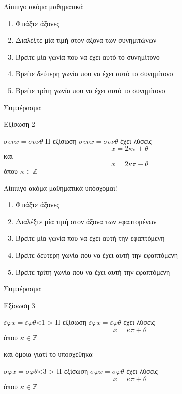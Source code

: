\documentclass[greek]{beamer}
\begin{document}
\begin{frame}{Λίιιιιιγο ακόμα μαθηματικά}
 \begin{enumerate}
  \item<1-> Φτιάξτε άξονες
  \item<2-> Διαλέξτε μία τιμή στον άξονα των συνημιτώνων
  \item<3-> Βρείτε μία γωνία που να έχει αυτό το συνημίτονο
  \item<4-> Βρείτε δεύτερη γωνία που να έχει αυτό το συνημίτονο
  \item<5-> Βρείτε τρίτη γωνία που να έχει αυτό το συνημίτονο
 \end{enumerate}
  Συμπέρασμα
\end{frame}

\begin{frame}{Εξίσωση 2}
 \begin{block}{$συνx=συνθ$}
  Η εξίσωση $συνx=συνθ$ έχει λύσεις
  $$x=2κπ+θ$$
  και
  $$x=2κπ-θ$$
  όπου $κ\in\mathbb{Z}$
 \end{block}
\end{frame}

\begin{frame}{Λίιιιιιγο ακόμα μαθηματικά υπόσχομαι!}
 \begin{enumerate}
  \item<1-> Φτιάξτε άξονες
  \item<2-> Διαλέξτε μία τιμή στον άξονα των εφαπτομένων
  \item<3-> Βρείτε μία γωνία που να έχει αυτή την εφαπτόμενη
  \item<4-> Βρείτε δεύτερη γωνία που να έχει αυτή την εφαπτόμενη
  \item<5-> Βρείτε τρίτη γωνία που να έχει αυτή την εφαπτόμενη
 \end{enumerate}
  Συμπέρασμα
\end{frame}

\begin{frame}{Εξίσωση 3}
 \begin{block}{$εφx=εφθ$}<1->
  Η εξίσωση $εφx=εφθ$ έχει λύσεις
  $$x=κπ+θ$$
  όπου $κ\in\mathbb{Z}$
 \end{block}
  και όμοια γιατί το υποσχέθηκα

 \begin{block}{$σφx=σφθ$}<3->
  Η εξίσωση $σφx=σφθ$ έχει λύσεις
  $$x=κπ+θ$$
  όπου $κ\in\mathbb{Z}$
 \end{block}
\end{frame}
\end{document}
